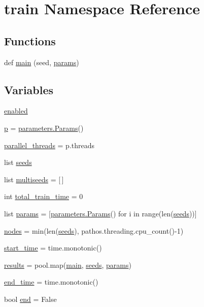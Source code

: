 \hypertarget{namespacetrain}{}\section{train Namespace Reference}
\label{namespacetrain}
\subsection*{Functions}
\begin{DoxyCompactItemize}
\item 
def \hyperlink{namespacetrain_a4ea2b96e58962af66d366c22c14118d7}{main} (seed, \hyperlink{namespacetrain_ab0738cb047f54be07fe3b6e00ccb6bde}{params})
\end{DoxyCompactItemize}
\subsection*{Variables}
\begin{DoxyCompactItemize}
\item 
\hyperlink{namespacetrain_a7f3180c74541ce586a70f3939459b22f}{enabled}
\item 
\hyperlink{namespacetrain_a1778402e6b76cfcc78aa05d331c47e5e}{p} = \hyperlink{classparameters_1_1_params}{parameters.\+Params}()
\item 
\hyperlink{namespacetrain_a02e7c583834b3067d0ee6283eddd59a4}{parallel\+\_\+threads} = p.\+threads
\item 
list \hyperlink{namespacetrain_ab97948c2558b988c502b658b274d55bd}{seeds}
\item 
list \hyperlink{namespacetrain_a55ff5a0fd8be24fcfc82156461c2f454}{multiseeds} = \mbox{[}$\,$\mbox{]}
\item 
int \hyperlink{namespacetrain_a1d4f05c9ef9967e5ae700450c0d6df71}{total\+\_\+train\+\_\+time} = 0
\item 
list \hyperlink{namespacetrain_ab0738cb047f54be07fe3b6e00ccb6bde}{params} = \mbox{[}\hyperlink{classparameters_1_1_params}{parameters.\+Params}() for i in range(len(\hyperlink{namespacetrain_ab97948c2558b988c502b658b274d55bd}{seeds}))\mbox{]}
\item 
\hyperlink{namespacetrain_a188bbaf51d6b5fb3054962f9c79caa10}{nodes} = min(len(\hyperlink{namespacetrain_ab97948c2558b988c502b658b274d55bd}{seeds}), pathos.\+threading.\+cpu\+\_\+count()-\/1)
\item 
\hyperlink{namespacetrain_ae49b53f438a208f1bfb27c7f72d09077}{start\+\_\+time} = time.\+monotonic()
\item 
\hyperlink{namespacetrain_a7b7ff8fca2a83224c8cdbe1fcb1d4f02}{results} = pool.\+map(\hyperlink{namespacetrain_a4ea2b96e58962af66d366c22c14118d7}{main}, \hyperlink{namespacetrain_ab97948c2558b988c502b658b274d55bd}{seeds}, \hyperlink{namespacetrain_ab0738cb047f54be07fe3b6e00ccb6bde}{params})
\item 
\hyperlink{namespacetrain_a111e2321e4df97a64696513dfe68cff5}{end\+\_\+time} = time.\+monotonic()
\item 
bool \hyperlink{namespacetrain_a2418a34a10769d1e1fc703573c0284cd}{end} = False
\end{DoxyCompactItemize}


